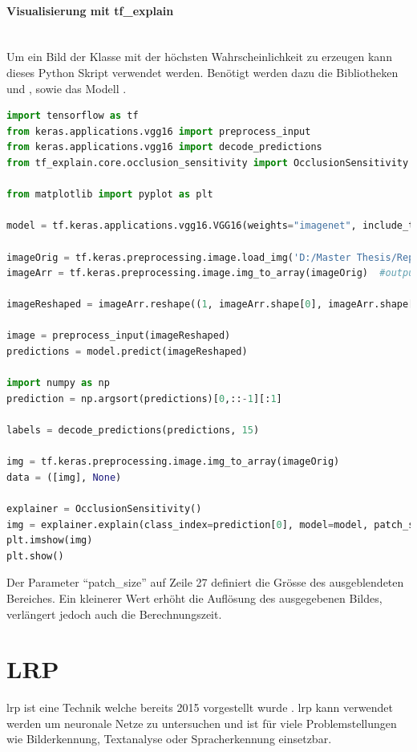 \documentclass[
  12pt, %
  a4paper, %
  oneside, %
  openany, 
  numbers=noenddot, %
  BCOR=5mm, %
  parskip=half*, %
  thesis, %
]{bfhbook}
\newcommand{\parag}[1]{\paragraph*{#1}\mbox{}\\}
\begin{document}
\parag{Visualisierung mit tf\_explain}
Um ein Bild der Klasse mit der höchsten Wahrscheinlichkeit zu erzeugen kann dieses Python Skript verwendet werden. Benötigt werden dazu die Bibliotheken \parencite{TensorFlow} und  \parencite{tfExplain}, sowie das Modell \parencite{vgg16}.
\begin{lstlisting}[language=Python, caption=Occlusion Sensitivity Visualisierung für die wahrscheinlichste Klasse]
import tensorflow as tf
from keras.applications.vgg16 import preprocess_input
from keras.applications.vgg16 import decode_predictions
from tf_explain.core.occlusion_sensitivity import OcclusionSensitivity

from matplotlib import pyplot as plt

model = tf.keras.applications.vgg16.VGG16(weights="imagenet", include_top=True)

imageOrig = tf.keras.preprocessing.image.load_img('D:/Master Thesis/Repo/Test Images/tabby.2.JPG', target_size=(224, 224))
imageArr = tf.keras.preprocessing.image.img_to_array(imageOrig)  #output Numpy-array

imageReshaped = imageArr.reshape((1, imageArr.shape[0], imageArr.shape[1], imageArr.shape[2]))

image = preprocess_input(imageReshaped)
predictions = model.predict(imageReshaped)

import numpy as np
prediction = np.argsort(predictions)[0,::-1][:1]

labels = decode_predictions(predictions, 15)

img = tf.keras.preprocessing.image.img_to_array(imageOrig)
data = ([img], None)
    
explainer = OcclusionSensitivity()
img = explainer.explain(class_index=prediction[0], model=model, patch_size= 40, validation_data=data)
plt.imshow(img)
plt.show()
\end{lstlisting}
Der Parameter ``patch\_size'' auf Zeile 27 definiert die Grösse des ausgeblendeten Bereiches. Ein kleinerer Wert erhöht die Auflösung des ausgegebenen Bildes, verlängert jedoch auch die Berechnungszeit.

\section{LRP}
\label{lrp}

\acrfull{lrp} ist eine Technik welche bereits 2015 vorgestellt wurde \parencite{Bach2015}. \acrshort{lrp} kann verwendet werden um neuronale Netze zu untersuchen und  ist für viele Problemstellungen wie Bilderkennung, Textanalyse oder Spracherkennung einsetzbar. 
\end{document}
